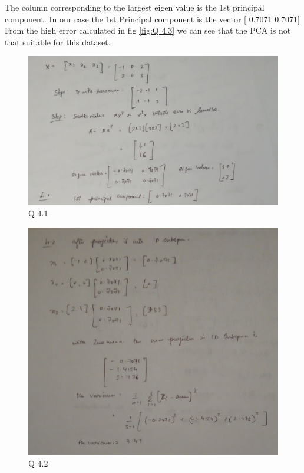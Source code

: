 \documentclass[10pt, letterpaper]{article}
\begin{document}
The column corresponding to the largest eigen value is the 1st principal component. In our case the 1st Principal component is the vector [ 0.7071 0.7071]\\ 
From the high error calculated in fig \ref{fig:Q 4.3} we can see that the PCA is not that suitable for this dataset. 
\begin{figure}[h!]
	\includegraphics[width=\linewidth]{4_1.jpg}
	\caption{Q 4.1}
	\label{fig:Q 4.1}
\end{figure}
\begin{figure}[h!]
	\includegraphics[width=\linewidth]{4_2.jpg}
	\caption{Q 4.2}
	\label{fig:Q 4.2}
\end{figure}
\end{document}
